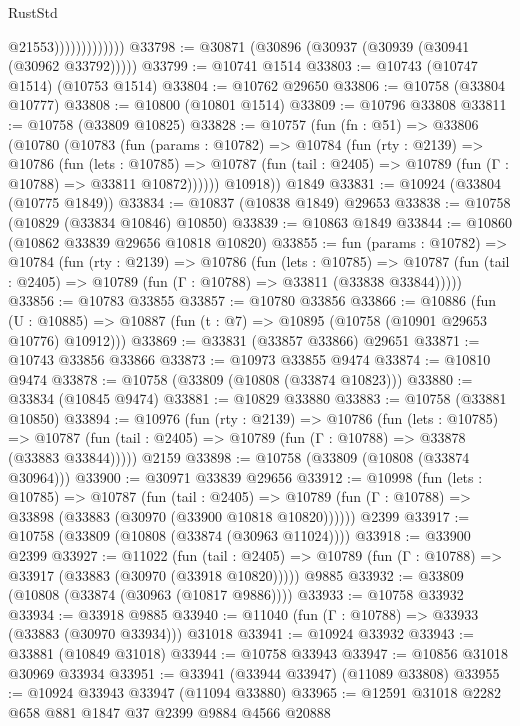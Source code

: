 \begin{lexlean}{RustStd}
\begin{coremodule}
                              @21553)))))))))))))
@33798 := @30871 (@30896 (@30937 (@30939 (@30941 (@30962 @33792)))))
@33799 := @10741 @1514
@33803 := @10743 (@10747 @1514) (@10753 @1514)
@33804 := @10762 @29650
@33806 := @10758 (@33804 @10777)
@33808 := @10800 (@10801 @1514)
@33809 := @10796 @33808
@33811 := @10758 (@33809 @10825)
@33828 := @10757
    (fun (fn : @51) =>
    @33806
      (@10780
        (@10783
          (fun (params : @10782) =>
          @10784
            (fun (rty : @2139) =>
            @10786
              (fun (lets : @10785) =>
              @10787 (fun (tail : @2405) => @10789 (fun (Γ : @10788) => @33811 @10872))))))
        @10918))
    @1849
@33831 := @10924 (@33804 (@10775 @1849))
@33834 := @10837 (@10838 @1849) @29653
@33838 := @10758 (@10829 (@33834 @10846) @10850)
@33839 := @10863 @1849
@33844 := @10860 (@10862 @33839 @29656 @10818 @10820)
@33855 := fun (params : @10782) =>
  @10784
    (fun (rty : @2139) =>
    @10786
      (fun (lets : @10785) =>
      @10787 (fun (tail : @2405) => @10789 (fun (Γ : @10788) => @33811 (@33838 @33844)))))
@33856 := @10783 @33855
@33857 := @10780 @33856
@33866 := @10886
    (fun (U : @10885) => @10887 (fun (t : @7) => @10895 (@10758 (@10901 @29653 @10776) @10912)))
@33869 := @33831 (@33857 @33866) @29651
@33871 := @10743 @33856 @33866
@33873 := @10973 @33855 @9474
@33874 := @10810 @9474
@33878 := @10758 (@33809 (@10808 (@33874 @10823)))
@33880 := @33834 (@10845 @9474)
@33881 := @10829 @33880
@33883 := @10758 (@33881 @10850)
@33894 := @10976
    (fun (rty : @2139) =>
    @10786
      (fun (lets : @10785) =>
      @10787 (fun (tail : @2405) => @10789 (fun (Γ : @10788) => @33878 (@33883 @33844)))))
    @2159
@33898 := @10758 (@33809 (@10808 (@33874 @30964)))
@33900 := @30971 @33839 @29656
@33912 := @10998
    (fun (lets : @10785) =>
    @10787
      (fun (tail : @2405) =>
      @10789 (fun (Γ : @10788) => @33898 (@33883 (@30970 (@33900 @10818 @10820))))))
    @2399
@33917 := @10758 (@33809 (@10808 (@33874 (@30963 @11024))))
@33918 := @33900 @2399
@33927 := @11022
    (fun (tail : @2405) => @10789 (fun (Γ : @10788) => @33917 (@33883 (@30970 (@33918 @10820)))))
    @9885
@33932 := @33809 (@10808 (@33874 (@30963 (@10817 @9886))))
@33933 := @10758 @33932
@33934 := @33918 @9885
@33940 := @11040 (fun (Γ : @10788) => @33933 (@33883 (@30970 @33934))) @31018
@33941 := @10924 @33932
@33943 := @33881 (@10849 @31018)
@33944 := @10758 @33943
@33947 := @10856 @31018 @30969 @33934
@33951 := @33941 (@33944 @33947) (@11089 @33808)
@33955 := @10924 @33943 @33947 (@11094 @33880)
@33965 := @12591 @31018 @2282 @658 @881 @1847 @37 @2399 @9884 @4566 @20888

\end{coremodule}
\end{lexlean}
